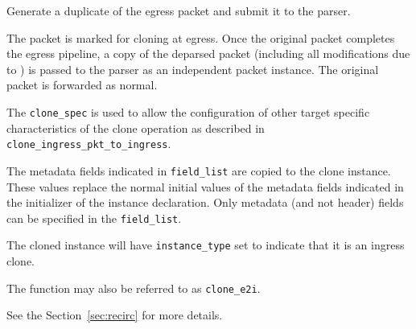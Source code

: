 \documentclass[12pt]{article}
\begin{document}
{ %
Generate a duplicate of the egress packet and submit it to the parser.
}
{ %
}
{ %
The packet is marked for cloning at egress. Once the original packet completes 
the egress pipeline, a copy of the deparsed packet (including all modifications 
due to \matchaction) is passed to the parser as an independent packet instance. 
The original packet is forwarded as normal.

The \texttt{clone_spec} is used to allow the configuration of other target specific 
characteristics of the clone operation as described in \texttt{clone_ingress_pkt_to_ingress}. 


The metadata fields indicated in \texttt{field_list} are copied to the clone instance. These 
values replace the normal initial values of the metadata fields indicated 
in the initializer of the instance declaration. Only metadata (and not header) fields can be specified in the \texttt{field_list}.

The cloned instance will have \texttt{instance_type} set to indicate that it is an 
ingress clone. 

The function may also be referred to as \texttt{clone_e2i}.

See the Section~\ref{sec:recirc} for more details.

}

\end{document}
